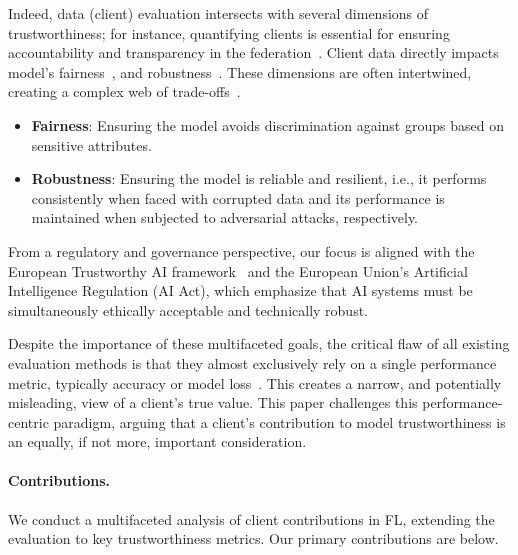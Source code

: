 \documentclass[sigconf]{acmart}
\begin{document}
Indeed, data (client) evaluation intersects with several dimensions of trustworthiness; for instance, quantifying clients is essential for ensuring accountability and transparency in the federation~\cite{siomos2023contribution}. Client data directly impacts model's fairness~\cite{mehrabi2021survey}, and robustness~\cite{goldblum2022dataset,ibitoye2019threat}. These dimensions are often intertwined, creating a complex web of trade-offs~\cite{liu2020privacy, shaham2023holistic, li2024triangular}. 

\begin{itemize}
    \item \textbf{Fairness}: Ensuring the model avoids discrimination against groups based on sensitive attributes.
    \item \textbf{Robustness}: Ensuring the model is reliable and resilient, i.e., it performs consistently when faced with corrupted data and its performance is maintained when subjected to adversarial attacks, respectively.
\end{itemize}

From a regulatory and governance perspective, our focus is aligned with the European Trustworthy AI framework~\cite{kaur2022trustworthy} and the European Union's Artificial Intelligence Regulation (AI Act), which emphasize that AI systems must be simultaneously ethically acceptable and technically robust. 

Despite the importance of these multifaceted goals, the critical flaw of all existing evaluation methods is that they almost exclusively rely on a single performance metric, typically accuracy or model loss~\cite{naidu2023review}. This creates a narrow, and potentially misleading, view of a client's true value. This paper challenges this performance-centric paradigm, arguing that a client's contribution to model trustworthiness is an equally, if not more, important consideration.

\paragraph{Contributions. }

We conduct a multifaceted analysis of client contributions in FL, extending the evaluation to key trustworthiness metrics. Our primary contributions are below.
\end{document}
